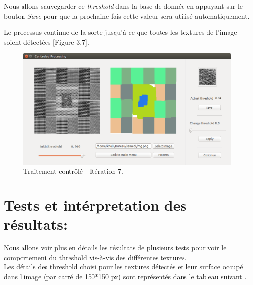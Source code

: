 \indent Nous allons sauvegarder ce \textit{threshold} dans la base de donnée en appuyant sur le bouton \textit{Save} pour que la prochaine fois cette valeur sera utilisé automatiquement.

Le processus continue de la sorte jusqu’à ce que toutes les textures de l'image soient détectées [Figure 3.7].


\begin{figure}[H]
	\centering
		\includegraphics[width=15cm,]{Figures/chap3/Capture5253.png}
	\caption[traitementAutofin]{Traitement contrôlé - Itération 7.}
\end{figure}

\section{Tests et intérpretation des résultats:}

Nous allons voir plus en détails les résultats de plusieurs tests pour voir le comportement du threshold vis-à-vis des différentes textures.\\

Les détails des threshold choisi pour les textures détectés et leur surface occupé dans l'image (par carré de 150*150 px) sont représentés dans le tableau suivant .\\



